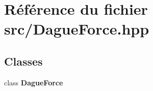 \section{Référence du fichier src/\-Dague\-Force.hpp}
\label{_dague_force_8hpp}
\subsection*{Classes}
\begin{DoxyCompactItemize}
\item 
class {\bf Dague\-Force}
\end{DoxyCompactItemize}
